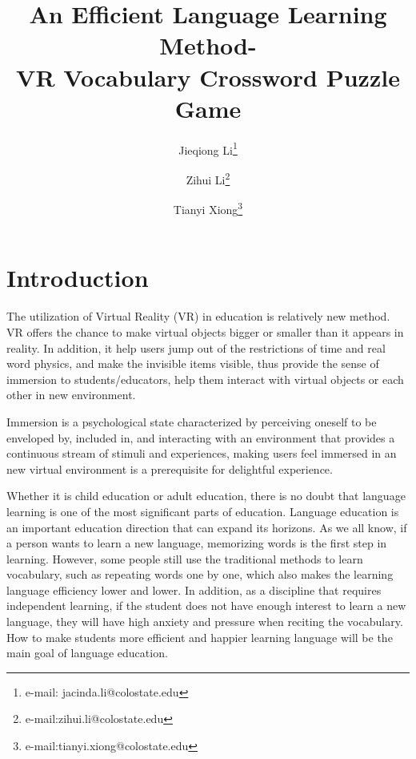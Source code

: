 \documentclass{vgtc}                          %
\title{An Efficient Language Learning Method-\\VR Vocabulary Crossword Puzzle Game}
\author{Jieqiong Li\thanks{e-mail: jacinda.li@colostate.edu} %
\and Zihui Li\thanks{e-mail:zihui.li@colostate.edu} %
\and Tianyi Xiong\thanks{e-mail:tianyi.xiong@colostate.edu}}
\affiliation{\scriptsize Colorado State University}
\begin{document}


\maketitle

\section{Introduction} %

The utilization of Virtual Reality (VR) in education is relatively new method. VR offers the chance to make virtual objects bigger or smaller than it appears in reality. In addition, it help users jump out of the restrictions of time and real word physics, and make the invisible items visible, thus provide the sense of immersion to students/educators, help them interact with virtual objects or each other in new environment.

Immersion is a psychological state characterized by perceiving oneself to be enveloped by, included in, and interacting with an environment that provides a continuous stream of stimuli and experiences, making users feel immersed in an new virtual environment is a prerequisite for delightful experience.

Whether it is child education or adult education, there is no doubt that language learning is one of the most significant parts of education. Language education is an important education direction that can expand its horizons. As we all know, if a person wants to learn a new language, memorizing words is the first step in learning. However, some people still use the traditional methods to learn vocabulary, such as repeating words one by one, which also makes the learning language efficiency lower and lower. In addition, as a discipline that requires independent learning, if the student does not have enough interest to learn a new language, they will have high anxiety and pressure when reciting the vocabulary. How to make students more efficient and happier learning language will be the main goal of language education. 
\end{document}
